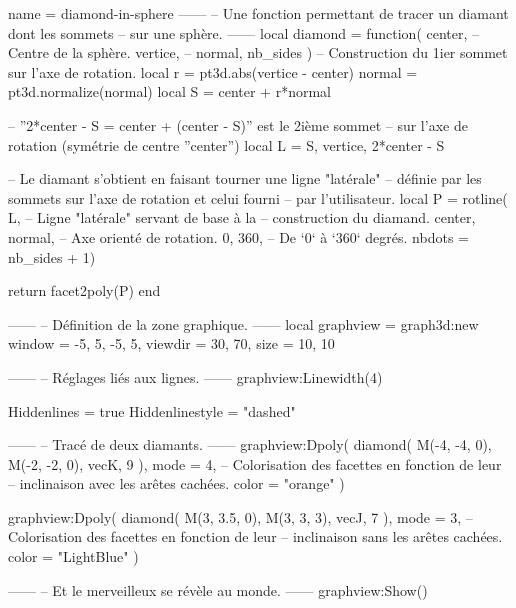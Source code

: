 \documentclass{standalone}
\begin{document}
\begin{luadraw}{name = diamond-in-sphere}
------
-- Une fonction permettant de tracer un diamant dont les sommets
-- sur une sphère.
------
local diamond = function(
  center,   -- Centre de la sphère.
  vertice,  --
  normal,
  nb_sides
)
-- Construction du 1ier sommet sur l'axe de rotation.
  local r = pt3d.abs(vertice - center)
  normal  = pt3d.normalize(normal)
  local S = center + r*normal

-- ''2*center - S = center + (center - S)'' est le 2ième sommet
-- sur l'axe de rotation (symétrie de centre ''center'')
  local L = {S, vertice, 2*center - S}

-- Le diamant s'obtient en faisant tourner une ligne "latérale"
-- définie par les sommets sur l'axe de rotation et celui fourni
-- par l'utilisateur.
  local P = rotline(
    L,                 -- Ligne "latérale" servant de base à la
                       -- construction du diamand.
    {center, normal},  -- Axe orienté de rotation.
    0, 360,            -- De `0` à `360` degrés.
    {nbdots = nb_sides + 1})

  return facet2poly(P)
end

------
-- Définition de la zone graphique.
------
local graphview = graph3d:new{
  window  = {-5, 5, -5, 5},
  viewdir = {30, 70},
  size    = {10, 10}
}

------
-- Réglages liés aux lignes.
------
graphview:Linewidth(4)

Hiddenlines     = true
Hiddenlinestyle = "dashed"

------
-- Tracé de deux diamants.
------
graphview:Dpoly(
  diamond(
    M(-4, -4, 0), M(-2, -2, 0), vecK,
    9
  ),
  {
    mode  = 4,  -- Colorisation des facettes en fonction de leur
                -- inclinaison avec les arêtes cachées.
    color = "orange"
  })

graphview:Dpoly(
  diamond(
    M(3, 3.5, 0), M(3, 3, 3), vecJ,
    7
  ),
  {
    mode  = 3,  -- Colorisation des facettes en fonction de leur
                -- inclinaison sans les arêtes cachées.
    color = "LightBlue"
  })

------
-- Et le merveilleux se révèle au monde.
------
graphview:Show()
\end{luadraw}
\end{document}
